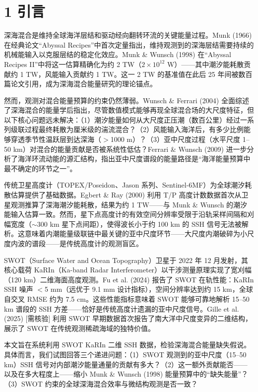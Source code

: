 \documentclass[11pt,a4paper]{article}
\begin{document}
\section*{1  引言}

深海混合是维持全球海洋层结和驱动经向翻转环流的关键能量过程。Munk (1966) 在经典论文``Abyssal Recipes''中首次定量指出，维持观测到的深海层结需要持续的机械能输入以克服层结的稳定化效应。Munk \& Wunsch (1998) 在``Abyssal Recipes II''中将这一估算精确化为约 2 TW（$2 \times 10^{12}$ W）——其中潮汐能耗散贡献约 1 TW，风能输入贡献约 1 TW。这一 2 TW 的基准值在此后 25 年间被数百篇论文引用，成为深海混合能量研究的理论锚点。\par

然而，观测对混合能量预算的约束仍然薄弱。Wunsch \& Ferrari (2004) 全面综述了深海混合的能量学后指出，尽管数值模式能够再现全球混合场的大尺度特征，但以下核心问题远未解决：（1）潮汐能量如何从大尺度正压潮（数百公里）经过一系列级联过程最终耗散为厘米级的湍流混合？（2）风能输入海洋后，有多少比例能够穿透季节性温跃层到达深海（$>$1000 m）？（3）亚中尺度过程（水平尺度 1--50 km）对混合的能量贡献是否被系统性低估？Ferrari \& Wunsch (2009) 进一步分析了海洋环流动能的源汇结构，指出亚中尺度谱段的能量路径是``海洋能量预算中最不确定的环节之一''。\par

传统卫星高度计（TOPEX/Poseidon、Jason 系列、Sentinel-6MF）为全球潮汐耗散估算提供了基础数据。Egbert \& Ray (2000) 利用 T/P 高度计数数据首次从卫星观测推算了深海潮汐能耗散，结果为约 1 TW——与 Munk \& Wunsch 的潮汐能输入估算一致。然而，星下点高度计的有效空间分辨率受限于沿轨采样间隔和刈幅宽度（$\sim$300 km 星下点间距），使得波长小于约 100 km 的 SSH 信号无法被解析。这意味着内潮能量级联链中最关键的亚中尺度环节——大尺度内潮破碎为小尺度内波的谱段——是传统高度计的观测盲区。\par

SWOT（Surface Water and Ocean Topography）卫星于 2022 年 12 月发射，其核心载荷 KaRIn（Ka-band Radar Interferometer）以干涉测量原理实现了宽刈幅（120 km）二维海面高度观测。Fu et al. (2024) 报告了 SWOT 在轨性能：KaRIn SSH 噪声 $<$5 mm（远优于 9.1 mm 设计指标），空间分辨率达到约 15 km，全球自交叉 RMSE 约为 7.5 cm。这些性能指标意味着 SWOT 能够可靠地解析 15--50 km 谱段的 SSH 方差——恰好是传统高度计遗漏的亚中尺度信号。Gille et al. (2025) [需核验] 利用 SWOT 早期数据首次报告了南大洋中尺度变异的二维结构，展示了 SWOT 在传统观测稀疏海域的独特价值。\par

本文旨在系统利用 SWOT KaRIn 二维 SSH 数据，检验深海混合能量缺失假说。具体而言，我们试图回答三个递进问题：（1）SWOT 观测到的亚中尺度（15--50 km）SSH 信号对内部潮汐能量通量的贡献有多大？（2）这一额外贡献能否——以及在多大程度上——缩小 Munk \& Wunsch (1998) 能量预算中的``缺失能量''？（3）SWOT 约束的全球深海混合效率与微结构观测是否一致？\par
\end{document}
